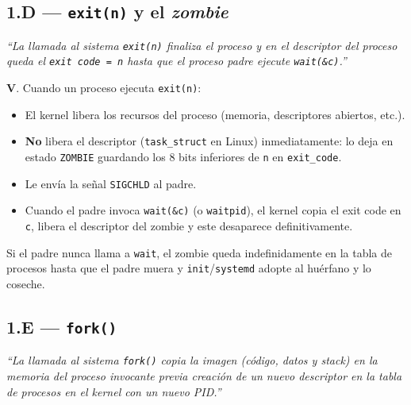 \documentclass[11pt,a4paper]{article}
\begin{document}
\subsection*{1.D --- \texttt{exit(n)} y el \emph{zombie}}

\emph{``La llamada al sistema \texttt{exit(n)} finaliza el proceso y
en el descriptor del proceso queda el \texttt{exit code = n} hasta
que el proceso padre ejecute \texttt{wait(\&c)}.''}

\begin{respuesta}
\textbf{V}. Cuando un proceso ejecuta \texttt{exit(n)}:

\begin{itemize}[leftmargin=*,nosep]
    \item El kernel libera los recursos del proceso (memoria,
        descriptores abiertos, etc.).
    \item \textbf{No} libera el descriptor (\texttt{task\_struct} en
        Linux) inmediatamente: lo deja en estado \texttt{ZOMBIE}
        guardando los $8$ bits inferiores de \texttt{n} en
        \texttt{exit\_code}.
    \item Le envía la señal \texttt{SIGCHLD} al padre.
    \item Cuando el padre invoca \texttt{wait(\&c)} (o
        \texttt{waitpid}), el kernel copia el exit code en
        \texttt{c}, libera el descriptor del zombie y este desaparece
        definitivamente.
\end{itemize}

Si el padre nunca llama a \texttt{wait}, el zombie queda
indefinidamente en la tabla de procesos hasta que el padre muera y
\texttt{init}/\texttt{systemd} adopte al huérfano y lo coseche.
\end{respuesta}

\subsection*{1.E --- \texttt{fork()}}

\emph{``La llamada al sistema \texttt{fork()} copia la imagen
(código, datos y stack) en la memoria del proceso invocante previa
creación de un nuevo descriptor en la tabla de procesos en el kernel
con un nuevo PID.''}
\end{document}
